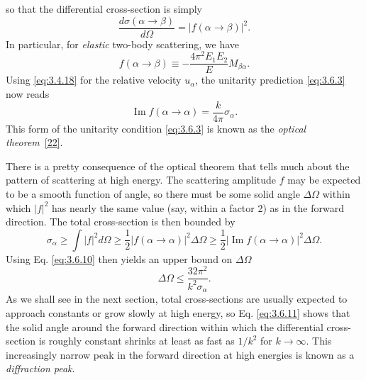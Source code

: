so that the differential cross-section is simply
\begin{equation}
 \frac{d\sigma(\alpha\to\beta)}{d\Omega}=|f(\alpha\to\beta)|^2.
 \tag{3.6.8}\label{eq:3.6.8}
\end{equation}
In particular, for \emph{elastic} two-body scattering, we have
\begin{equation}
 f(\alpha\to\beta)\equiv-\frac{4\pi^2E_1E_2}{E}M_{\beta\alpha}.
 \tag{3.6.9}\label{eq:3.6.9}
\end{equation}
Using \eqref{eq:3.4.18} for the relative velocity $u_\alpha$, the unitarity prediction \eqref{eq:3.6.3} now reads
\begin{equation}
 \operatorname{Im}f(\alpha\to\alpha)=\frac{k}{4\pi}\sigma_\alpha.
 \tag{3.6.10}\label{eq:3.6.10}
\end{equation}
This form of the unitarity condition \eqref{eq:3.6.3} is known as the \emph{optical theorem}~\hyperref[ref:3.22]{[22]}.

There is a pretty consequence of the optical theorem that tells much about the pattern of
scattering at high energy. The scattering amplitude $f$ may be expected to be a smooth function
of angle, so there must be some solid angle $\Delta\Omega$ within which $|f|^2$ has nearly the
same value (say, within a factor 2) as in the forward direction. The total cross-section is then
bounded by
\[
 \sigma_\alpha\geq\int|f|^2d\Omega
 \geq\frac{1}{2}|f(\alpha\to\alpha)|^2\Delta\Omega
 \geq\frac{1}{2}|\operatorname{Im}f(\alpha\to\alpha)|^2\Delta\Omega.
\]
Using Eq. \eqref{eq:3.6.10} then yields an upper bound on $\Delta\Omega$
\begin{equation}
 \Delta\Omega\leq\frac{32\pi^2}{k^2\sigma_\alpha}.
 \tag{3.6.11}\label{eq:3.6.11}
\end{equation}
As we shall see in the next section, total cross-sections are usually expected to approach
constants or grow slowly at high energy, so Eq. \eqref{eq:3.6.11} shows that the solid angle around the
forward direction within which the differential cross-section is roughly constant shrinks at
least as fast as $1/k^2$ for $k\to\infty$. This increasingly narrow peak in the forward direction
at high energies is known as a \emph{diffraction peak}.

